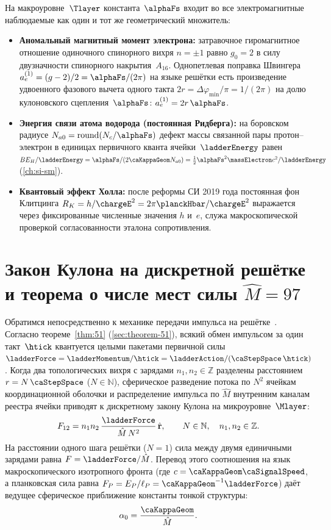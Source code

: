 На макроуровне~$\Tlayer$ константа~$\alphaFs$ входит во все электромагнитные наблюдаемые как один и тот же геометрический множитель:
\begin{itemize}[leftmargin=*]
\item \textbf{Аномальный магнитный момент электрона:}
  затравочное гиромагнитное отношение одиночного спинорного вихря $n=\pm 1$ равно $g_0 = 2$ в силу двузначности спинорного накрытия~$A_{16}$.
  Однопетлевая поправка Швингера $a_e^{(1)} = (g-2)/2 = \alphaFs/(2\pi)$ на языке решётки есть произведение удвоенного фазового вычета одного такта $2r = \Delta\varphi_{\min}/\pi = 1/(2\pi)$ на долю кулоновского сцепления~$\alphaFs$: $a_e^{(1)} = 2r\,\alphaFs$.
\item \textbf{Энергия связи атома водорода (постоянная Ридберга):}
  на боровском радиусе $N_{a0} = \mathrm{round}(N_c/\alphaFs)$ дефект массы связанной пары протон--электрон в единицах первичного кванта ячейки~$\ladderEnergy$ равен $BE_H/\ladderEnergy = \alphaFs/(2\caKappaGeom N_{a0}) = \tfrac{1}{2}\alphaFs^2\massElectron c^2/\ladderEnergy$ (\cref{ch:si-sm}).
\item \textbf{Квантовый эффект Холла:}
  после реформы СИ 2019 года постоянная фон Клитцинга $R_K = h/\chargeE^2 = 2\pi\planckHbar/\chargeE^2$ выражается через фиксированные численные значения $h$ и~$e$, служа макроскопической проверкой согласованности эталона сопротивления.
\end{itemize}

\section{Закон Кулона на дискретной решётке и теорема о числе мест силы $\hat M = 97$}
\label{sec:force-lattice}

Обратимся непосредственно к механике передачи импульса на решётке~\latGCKshort.
Согласно теореме~\ref{thm:51} (\cref{sec:theorem-51}), всякий обмен импульсом за один такт~$\htick$ квантуется целыми пакетами первичной силы $\ladderForce = \ladderMomentum/\htick = \ladderAction/(\caStepSpace\,\htick)$.
Когда два топологических вихря с зарядами $n_1,n_2\in\mathbb{Z}$ разделены расстоянием $r = N\,\caStepSpace$ ($N\in\mathbb{N}$),
сферическое разведение потока по $N^2$ ячейкам координационной оболочки и распределение импульса по $\hat M$ внутренним каналам реестра ячейки приводят к дискретному закону Кулона на микроуровне~$\Mlayer$:
\[
  F_{12} = n_1 n_2\,\frac{\ladderForce}{\hat M\,N^{2}}\,\hat{\mathbf{r}},
  \qquad N\in\mathbb{N},\quad n_1,n_2\in\mathbb{Z}.
\]
На расстоянии одного шага решётки ($N=1$) сила между двумя единичными зарядами равна $F = \ladderForce / \hat M$.
Перевод этого соотношения на язык макроскопического изотропного фронта (где $c = \caKappaGeom\caSignalSpeed$, а планковская сила равна $F_P = E_P/\ell_P = \caKappaGeom^{-1}\ladderForce$) даёт ведущее сферическое приближение константы тонкой структуры:
\[
  \alpha_0 = \frac{\caKappaGeom}{\hat M}.
\]

